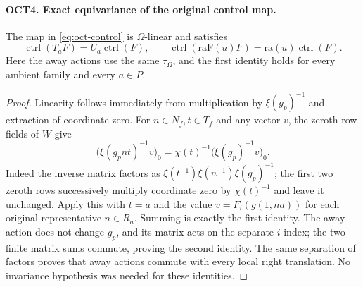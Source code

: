 \documentclass[11pt,a4paper]{article}
\numberwithin{equation}{section}
\theoremstyle{remark}\newtheorem{remark}[theorem]{Remark}
\begin{document}
\paragraph{OCT4. Exact equivariance of the original control map.}
\label{claim:OCT4}
The map in \eqref{eq:oct-control} is $\Omega$-linear and satisfies
\begin{equation}\label{eq:oct-equivariance}
 \operatorname{ctrl}(T_aF)=U_a\operatorname{ctrl}(F),\qquad
 \operatorname{ctrl}(\mathrm{raF}(u)F)
                         =\mathrm{ra}(u)\operatorname{ctrl}(F).
\end{equation}
Here the away actions use the same $\tau_\Omega$, and the first
identity holds for every ambient family and every $a\in P$.
\begin{proof}
Linearity follows immediately from multiplication by
$\xi(g_p)^{-1}$ and extraction of coordinate zero.  For
$n\in N_f,\allowbreak{} t\in T_f$ and any vector $v$, the zeroth-row fields
of $W$ give
\[
 \bigl(\xi(g_pnt)^{-1}v\bigr)_0
      =\chi(t)^{-1}\bigl(\xi(g_p)^{-1}v\bigr)_0.
\]
Indeed the inverse matrix factors as
$\xi(t^{-1})\xi(n^{-1})\xi(g_p)^{-1}$; the first two zeroth
rows successively multiply coordinate zero by $\chi(t)^{-1}$
and leave it unchanged.  Apply this with $t=a$ and the value
$v=F_i(g(1,\allowbreak{} na))$ for each original representative $n\in R_a$.
Summing is exactly the first identity.  The away action does
not change $g_p$, and its matrix acts on the separate $i$ index;
the two finite matrix sums commute, proving the second identity.
The same separation of factors proves that away actions commute
with every local right translation.  No invariance hypothesis
was needed for these identities.
\end{proof}

\end{document}
